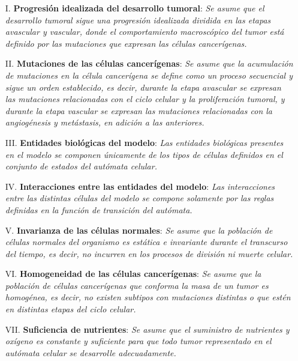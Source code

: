 \begin{enumerate}
\item [{I.}] \textbf{Progresi\'on idealizada del desarrollo tumoral}: \emph{Se asume que el desarrollo tumoral sigue una progresi\'on idealizada dividida en las etapas avascular y vascular, donde el comportamiento macrosc\'opico del tumor est\'a definido por las mutaciones que expresan las c\'elulas cancer\'igenas.} \label{hI}

\item [{II.}] \textbf{Mutaciones de las c\'elulas cancer\'igenas}: \emph{Se asume que la acumulaci\'on de mutaciones en la c\'elula cancer\'igena se define como un proceso secuencial y sigue un orden establecido, es decir, durante la etapa avascular se expresan las mutaciones relacionadas con el ciclo celular y la proliferaci\'on tumoral, y durante la etapa vascular se expresan las mutaciones relacionadas con la angiog\'enesis y met\'astasis, en adici\'on a las anteriores.} \label{hII}

\item [{III.}] \textbf{Entidades biol\'ogicas del modelo}: \emph{Las entidades biol\'ogicas presentes en el modelo se componen \'unicamente de los tipos de c\'elulas definidos en el conjunto de estados del aut\'omata celular.} \label{hIII}

\item [{IV.}] \textbf{Interacciones entre las entidades del modelo}: \emph{Las interacciones entre las distintas c\'elulas del modelo se compone solamente por las reglas definidas en la funci\'on de transici\'on del aut\'omata.} \label{hIV}

\item [{V.}] \textbf{Invarianza de las c\'elulas normales}: \emph{Se asume que la poblaci\'on de c\'elulas normales del organismo es est\'atica e invariante durante el transcurso del tiempo, es decir, no incurren en los procesos de divisi\'on ni muerte celular.} \label{hV}

\item [{VI.}] \textbf{Homogeneidad de las c\'elulas cancer\'igenas}: \emph{Se asume que la poblaci\'on de c\'elulas cancer\'igenas que conforma la masa de un tumor es homog\'enea, es decir, no existen subtipos con mutaciones distintas o que est\'en en distintas etapas del ciclo celular.} \label{hVI}

\item [{VII.}] \textbf{Suficiencia de nutrientes}: \emph{Se asume que el suministro de nutrientes y ox\'igeno es constante y suficiente para que todo tumor representado en el aut\'omata celular se desarrolle adecuadamente.} \label{hVII}


\end{enumerate}
